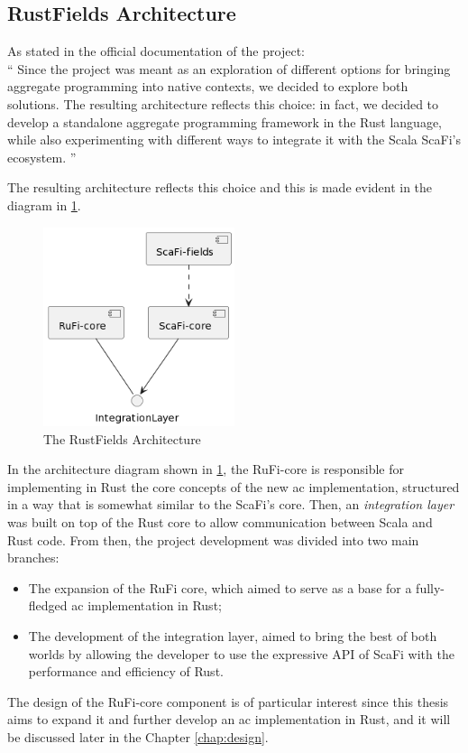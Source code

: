 \subsection{RustFields Architecture}
As stated in the official documentation of the project: \\
``    Since the project was meant as an exploration of different options for bringing aggregate programming into native contexts, we decided to explore both solutions. The resulting architecture reflects this choice: in fact, we decided to develop a standalone aggregate programming framework in the Rust language, while also experimenting with different ways to integrate it with the Scala ScaFi’s ecosystem.
''

The resulting architecture reflects this choice and this is made evident in the diagram in \cref{fig:rustfields-architecture}.

\begin{figure}[h]
    \centering
    \includegraphics[width=0.5\textwidth]{figures/diagrams/img/rustfields-full-architecture.png}
    \caption{The RustFields Architecture}
    \label{fig:rustfields-architecture}
\end{figure}

In the architecture diagram shown in \cref{fig:rustfields-architecture}, the RuFi-core is responsible for implementing in Rust the core concepts of the new \ac{ac} implementation,
structured in a way that is somewhat similar to the ScaFi's core. Then, an \textit{integration layer} was built on top of the Rust core to allow communication
between Scala and Rust code. From then, the project development was divided into two main branches:
\begin{itemize}
    \item The expansion of the RuFi core, which aimed to serve as a base for a fully-fledged \ac{ac} implementation in Rust;
    \item The development of the integration layer, aimed to bring the best of both worlds by allowing the developer to use the expressive API of ScaFi with the performance and efficiency of Rust.
\end{itemize}

The design of the RuFi-core component is of particular interest since this thesis aims to expand it and further develop an \ac{ac} implementation in Rust, and it will be discussed
later in the Chapter \ref{chap:design}.